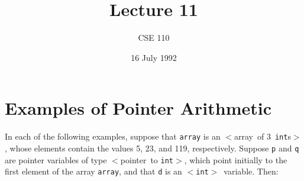 %
%
%


\def\brac#1{$<$#1$>$}
\def\Int{{\tt int}}
\def\int{\brac{\Int}}
\def\int{\brac{\Int}}
\def\Shortint{{\tt short~int}}
\def\shortint{\brac{\Shortint}}
\def\Longint{{\tt long~int}}
\def\longint{\brac{\Longint}}
\def\Float{{\tt float}}
\def\float{\brac{\Float}}
\def\Double{{\tt double}}
\def\double{\brac{\Double}}
\def\Char{{\tt char}}
\def\chr{\brac{\Char}}
\def\Void{{\tt void}}
\def\void{\brac{\Void}}

\def\ptr#1{pointer~to #1}
\def\p2#1{\brac{\ptr#1}}
\def\Ano#1#2{array~of {#1}~#2s}
\def\ano#1#2{\brac{\Ano#1#2}}
\def\Ao#1{array~of #1}
\def\ao#1{\brac{\Ao#1}}

\def\breakhere{\mbox{$\otimes$}}
\parskip 8pt


\title{Lecture 11}
\author{CSE 110}
\date{16 July 1992}

\pagestyle{fancy}
\rhead{\thepage}
\cfoot{}





\maketitle

\section{Examples of Pointer Arithmetic}

In each of the following examples, suppose that {\tt array} is an \ano
3\Int, whose elements contain the values 5, 23, and 119, respectively.
Suppose {\tt p} and {\tt q} are pointer variables of type \p2\Int, which
point initially to the first element of the array {\tt array}, and that
{\tt d} is an \int\ variable.  Then:

